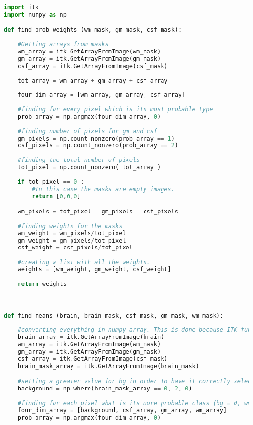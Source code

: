 \documentclass{standalone}
\begin{document}
\lstset{style=python}
	\begin{lstlisting}[language=python, caption = Parameters Estimation, label=parameters]
import itk
import numpy as np

def find_prob_weights (wm_mask, gm_mask, csf_mask):
    
    #Getting arrays from masks
    wm_array = itk.GetArrayFromImage(wm_mask)
    gm_array = itk.GetArrayFromImage(gm_mask)
    csf_array = itk.GetArrayFromImage(csf_mask)
    
    tot_array = wm_array + gm_array + csf_array
    
    four_dim_array = [wm_array, gm_array, csf_array]
    
    #finding for every pixel which is its most probable type
    prob_array = np.argmax(four_dim_array, 0)
    
    #finding number of pixels for gm and csf
    gm_pixels = np.count_nonzero(prob_array == 1)
    csf_pixels = np.count_nonzero(prob_array == 2)
    
    #finding the total number of pixels
    tot_pixel = np.count_nonzero( tot_array )
    
    if tot_pixel == 0 :
        #In this case the masks are empty images.
        return [0,0,0]

    wm_pixels = tot_pixel - gm_pixels - csf_pixels
    
    #finding weights for the masks
    wm_weight = wm_pixels/tot_pixel
    gm_weight = gm_pixels/tot_pixel
    csf_weight = csf_pixels/tot_pixel
    
    #creating a list with all the weights.
    weights = [wm_weight, gm_weight, csf_weight]
    
    return weights



def find_means (brain, brain_mask, csf_mask, gm_mask, wm_mask):
 
    #converting everything in numpy array. This is done because ITK functions in python are not always wrapped for every type. 
    brain_array = itk.GetArrayFromImage(brain) 
    wm_array = itk.GetArrayFromImage(wm_mask)
    gm_array = itk.GetArrayFromImage(gm_mask)
    csf_array = itk.GetArrayFromImage(csf_mask)
    brain_mask_array = itk.GetArrayFromImage(brain_mask)

    #setting a greater value for bg in order to have it correctly selected in prob array
    background = np.where(brain_mask_array == 0, 2, 0)
    
    #finding for each pixel what is its more probable class (bg = 0, wm = 3, gm = 2, csf = 1) 
    four_dim_array = [background, csf_array, gm_array, wm_array]
    prob_array = np.argmax(four_dim_array, 0)
    

\end{lstlisting}
\end{document}

